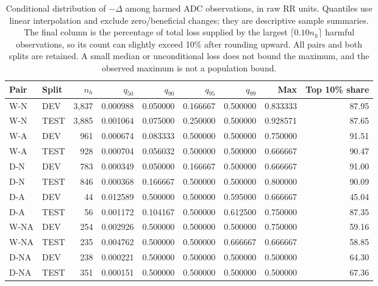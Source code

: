 \begin{table}[htbp]
\centering\footnotesize\setlength{\tabcolsep}{3pt}
\caption{Conditional distribution of $-\Delta$ among harmed ADC observations, in raw RR units. Quantiles use linear interpolation and exclude zero/beneficial changes; they are descriptive sample summaries. The final column is the percentage of total loss supplied by the largest $\lceil0.10n_h\rceil$ harmful observations, so its count can slightly exceed 10\% after rounding upward. All pairs and both splits are retained. A small median or unconditional loss does not bound the maximum, and the observed maximum is not a population bound.}
\label{tab:outcome-tails}
\begin{tabular}{llrrrrrrr}
\toprule
Pair & Split & $n_h$ & $q_{50}$ & $q_{90}$ & $q_{95}$ & $q_{99}$ & Max & Top 10\% share\\
\midrule
W-N & DEV & 3,837 & 0.000988 & 0.050000 & 0.166667 & 0.500000 & 0.833333 & 87.95\\
W-N & TEST & 3,885 & 0.001064 & 0.075000 & 0.250000 & 0.500000 & 0.928571 & 87.65\\
W-A & DEV & 961 & 0.000674 & 0.083333 & 0.500000 & 0.500000 & 0.750000 & 91.51\\
W-A & TEST & 928 & 0.000704 & 0.056032 & 0.500000 & 0.500000 & 0.666667 & 90.47\\
D-N & DEV & 783 & 0.000349 & 0.050000 & 0.166667 & 0.500000 & 0.666667 & 91.00\\
D-N & TEST & 846 & 0.000368 & 0.166667 & 0.500000 & 0.500000 & 0.800000 & 90.09\\
D-A & DEV & 44 & 0.012589 & 0.500000 & 0.500000 & 0.595000 & 0.666667 & 45.04\\
D-A & TEST & 56 & 0.001172 & 0.104167 & 0.500000 & 0.612500 & 0.750000 & 87.35\\
W-NA & DEV & 254 & 0.002926 & 0.500000 & 0.500000 & 0.500000 & 0.750000 & 59.16\\
W-NA & TEST & 235 & 0.004762 & 0.500000 & 0.500000 & 0.666667 & 0.666667 & 58.85\\
D-NA & DEV & 238 & 0.000221 & 0.500000 & 0.500000 & 0.500000 & 0.500000 & 64.30\\
D-NA & TEST & 351 & 0.000151 & 0.500000 & 0.500000 & 0.500000 & 0.500000 & 67.36\\
\bottomrule
\end{tabular}
\end{table}
